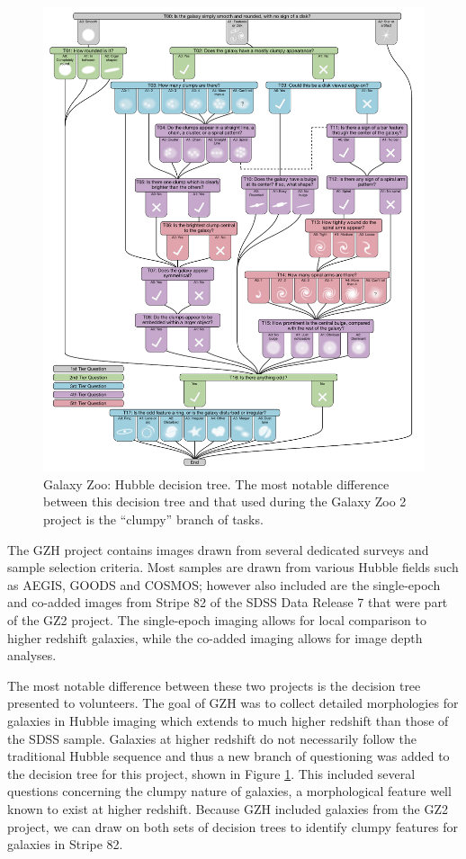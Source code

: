 \begin{figure}
\includegraphics[width=\textwidth]{Figures/gz3_tree_resized.pdf}
\caption[Galaxy Zoo: Hubble decision tree.]{Galaxy Zoo: Hubble decision tree. The most notable difference between this decision tree and that used during the Galaxy Zoo 2 project is the ``clumpy'' branch of tasks.}
\label{fig: gzh decision tree}
\end{figure}

The GZH project contains images drawn from several dedicated surveys and sample selection criteria. Most samples are drawn from various Hubble fields such as AEGIS, GOODS and COSMOS; however also included are the single-epoch and co-added images from Stripe 82 of the SDSS Data Release 7 that were part of the GZ2 project. The single-epoch imaging allows for local comparison to higher redshift galaxies, while the co-added imaging allows for image depth analyses. 

The most notable difference between these two projects is the decision tree presented to volunteers. The goal of GZH was to collect detailed morphologies for galaxies in Hubble imaging which extends to much higher redshift than those of the SDSS sample. Galaxies at higher redshift do not necessarily follow the traditional Hubble sequence and thus a new branch of questioning was added to the decision tree for this project, shown in Figure \ref{fig: gzh decision tree}. This included several questions concerning the clumpy nature of galaxies, a morphological feature well known to exist at higher redshift. Because GZH included galaxies from the GZ2 project, we can draw on both sets of decision trees to identify clumpy features for galaxies in Stripe 82.


